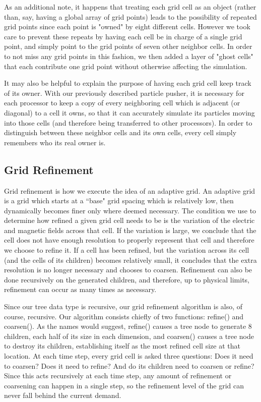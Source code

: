 \documentclass[]{article}
\begin{document}
As an additional note, it happens that treating each grid cell as an object (rather than, say, having a global array of grid points) leads to the possibility of repeated grid points since each point is "owned" by eight different cells. However we took care to prevent these repeats by having each cell be in charge of a single grid point, and simply point to the grid points of seven other neighbor cells. In order to not miss any grid points in this fashion, we then added a layer of "ghost cells" that each contribute one grid point without otherwise affecting the simulation.

It may also be helpful to explain the purpose of having each grid cell keep track of its owner. With our previously described particle pusher, it is necessary for each processor to keep a copy of every neighboring cell which is adjacent (or diagonal) to a cell it owns, so that it can accurately simulate its particles moving into those cells (and therefore being transferred to other processors). In order to distinguish between these neighbor cells and its own cells, every cell simply remembers who its real owner is.

\subsection{Grid Refinement}
Grid refinement is how we execute the idea of an adaptive grid. An adaptive grid is a grid which starts at a ``base" grid spacing which is relatively low, then dynamically becomes finer only where deemed necessary. The condition we use to determine how refined a given grid cell needs to be is the variation of the electric and magnetic fields across that cell. If the variation is large, we conclude that the cell does not have enough resolution to properly represent that cell and therefore we choose to refine it. If a cell has been refined, but the variation across its cell (and the cells of its children) becomes relatively small, it concludes that the extra resolution is no longer necessary and chooses to coarsen. Refinement can also be done recursively on the generated children, and therefore, up to physical limits, refinement can occur as many times as necessary.

Since our tree data type is recursive, our grid refinement algorithm is also, of course, recursive. Our algorithm consists chiefly of two functions: refine() and coarsen(). As the names would suggest, refine() causes a tree node to generate 8 children, each half of its size in each dimension, and coarsen() causes a tree node to destroy its children, establishing itself as the most refined cell size at that location. At each time step, every grid cell is asked three questions: Does it need to coarsen? Does it need to refine? And do its children need to coarsen or refine? Since this acts recursively at each time step, any amount of refinement or coarsening can happen in a single step, so the refinement level of the grid can never fall behind the current demand.
\end{document}
